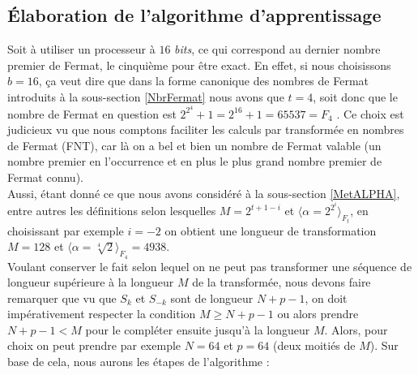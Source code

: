 \subsection{Élaboration de l'algorithme d'apprentissage}\label{Etapes}
Soit à utiliser un processeur à $ 16 $ \emph{bits}, ce qui correspond au dernier nombre premier de Fermat, le cinquième pour être exact. En effet, si nous choisissons $ b=16 $, ça veut dire que dans la forme canonique des nombres de Fermat introduits à la sous-section \ref{NbrFermat} nous avons que $ t=4 $, soit donc que le nombre de Fermat en question est $ 2^{2^{4}}+1 = 2^{16}+1 = 65537 = F_{4}$ . Ce choix est judicieux vu que nous comptons faciliter les calculs par transformée en nombres de Fermat (FNT), car là on a bel et bien un nombre de Fermat valable (un nombre premier en l'occurrence et en plus le plus grand nombre premier de Fermat connu).\\
Aussi, étant donné ce que nous avons considéré à la sous-section \ref{MetALPHA}, entre autres les définitions selon lesquelles $ M = 2^{t+1-i} $ et $ \langle\alpha = 2^{2^{i}}\rangle_{F_{t}} $, en choisissant par exemple $ i=-2 $ on obtient une longueur de transformation $ M=128 $ et $ \langle\alpha = \sqrt[4]{2}\rangle_{F_{4}} = 4938 $.\\
Voulant conserver le fait selon lequel on ne peut pas transformer une séquence de longueur supérieure à la longueur $ M $ de la transformée, nous devons faire remarquer que vu que $ S_{k} $ et $ S_{-k} $ sont de longueur $ N+p-1 $, on doit impérativement respecter la condition $ M\geq N+p-1 $ ou alors prendre $ N+p-1 < M $ pour le compléter ensuite jusqu'à la longueur $ M $. Alors, pour choix on peut prendre par exemple $ N=64 $ et $ p=64 $ (deux moitiés de $ M $). Sur base de cela, nous aurons les étapes de l'algorithme :
